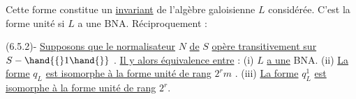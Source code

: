 Cette forme constitue un \uline{invariant} de l'algèbre galoisienne $L$ considérée.
C'est la forme unité si $L$ a une BNA. Réciproquement :

(6.5.2)- \uline{Supposons que le normalisateur} $N$ \uline{de} $S$ \uline{opère transitivement sur}
$S - \hand{\{}1\hand{\}}$ . \uline{Il y alors équivalence entre} :
(i) $L$ \uline{a une} BNA.
(ii) \uline{La forme} $q_L$ \uline{est isomorphe à la forme unité de rang} $2^r m$ .
(iii) \uline{La forme} $q^1_L$ \uline{est isomorphe à la forme unité de rang} $2^r$.

